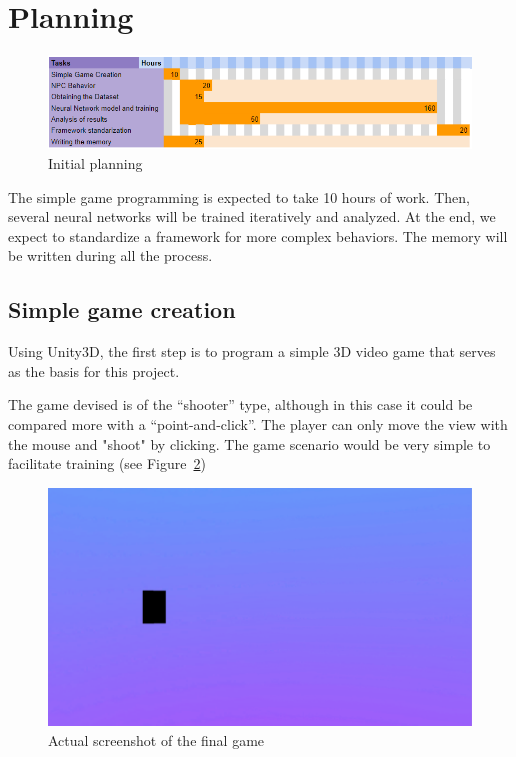 \section{Planning}

\begin{figure}
  \centering
		\includegraphics[width=.9\textwidth]{img/ganttChart.png}
  \caption{Initial planning}
  \label{fig:planchart}
\end{figure}

The simple game programming is expected to take 10 hours of work. Then, several neural networks will be trained iteratively and analyzed. At the end, we expect to standardize a framework for more complex behaviors.
The memory will be written during all the process.

\subsection{Simple game creation}

Using Unity3D, the first step is to program a simple 3D video game that serves as the basis for this project.

The game devised is of the “shooter” type, although in this case it could be compared more with a “point-and-click”. The player can only move the view with the mouse and "shoot" by clicking. The game scenario would be very simple to facilitate training (see Figure~\ref{fig:ingame})

\begin{figure}[h]
  \centering
		\includegraphics[width=.9\textwidth]{img/inGame.png}
  \caption{Actual screenshot of the final game}
  \label{fig:ingame}
\end{figure}

